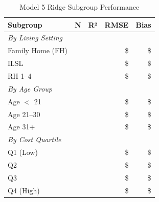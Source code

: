 \begin{table}[h]
\centering
\caption{Model 5 Ridge Subgroup Performance}
\begin{tabular}{lrrrr}
\toprule
\textbf{Subgroup} & \textbf{N} & \textbf{R²} & \textbf{RMSE} & \textbf{Bias} \\
\midrule
\multicolumn{5}{l}{\textit{By Living Setting}} \\
Family Home (FH) & \ModelFiveSubgrouplivingFHN{} & \ModelFiveSubgrouplivingFHRSquared{} & \$\ModelFiveSubgrouplivingFHRMSE{} & \$\ModelFiveSubgrouplivingFHBias{} \\
ILSL & \ModelFiveSubgrouplivingILSLN{} & \ModelFiveSubgrouplivingILSLRSquared{} & \$\ModelFiveSubgrouplivingILSLRMSE{} & \$\ModelFiveSubgrouplivingILSLBias{} \\
RH 1--4 & \ModelFiveSubgrouplivingRHOneToFourN{} & \ModelFiveSubgrouplivingRHOneToFourRSquared{} & \$\ModelFiveSubgrouplivingRHOneToFourRMSE{} & \$\ModelFiveSubgrouplivingRHOneToFourBias{} \\
\midrule
\multicolumn{5}{l}{\textit{By Age Group}} \\
Age $<$ 21 & \ModelFiveSubgroupageAgeUnderTwentyOneN{} & \ModelFiveSubgroupageAgeUnderTwentyOneRSquared{} & \$\ModelFiveSubgroupageAgeUnderTwentyOneRMSE{} & \$\ModelFiveSubgroupageAgeUnderTwentyOneBias{} \\
Age 21--30 & \ModelFiveSubgroupageAgeTwentyOneToThirtyN{} & \ModelFiveSubgroupageAgeTwentyOneToThirtyRSquared{} & \$\ModelFiveSubgroupageAgeTwentyOneToThirtyRMSE{} & \$\ModelFiveSubgroupageAgeTwentyOneToThirtyBias{} \\
Age 31+ & \ModelFiveSubgroupageAgeThirtyOnePlusN{} & \ModelFiveSubgroupageAgeThirtyOnePlusRSquared{} & \$\ModelFiveSubgroupageAgeThirtyOnePlusRMSE{} & \$\ModelFiveSubgroupageAgeThirtyOnePlusBias{} \\
\midrule
\multicolumn{5}{l}{\textit{By Cost Quartile}} \\
Q1 (Low) & \ModelFiveSubgroupcostQOneLowN{} & \ModelFiveSubgroupcostQOneLowRSquared{} & \$\ModelFiveSubgroupcostQOneLowRMSE{} & \$\ModelFiveSubgroupcostQOneLowBias{} \\
Q2 & \ModelFiveSubgroupcostQTwoN{} & \ModelFiveSubgroupcostQTwoRSquared{} & \$\ModelFiveSubgroupcostQTwoRMSE{} & \$\ModelFiveSubgroupcostQTwoBias{} \\
Q3 & \ModelFiveSubgroupcostQThreeN{} & \ModelFiveSubgroupcostQThreeRSquared{} & \$\ModelFiveSubgroupcostQThreeRMSE{} & \$\ModelFiveSubgroupcostQThreeBias{} \\
Q4 (High) & \ModelFiveSubgroupcostQFourHighN{} & \ModelFiveSubgroupcostQFourHighRSquared{} & \$\ModelFiveSubgroupcostQFourHighRMSE{} & \$\ModelFiveSubgroupcostQFourHighBias{} \\
\bottomrule
\end{tabular}
\end{table}

